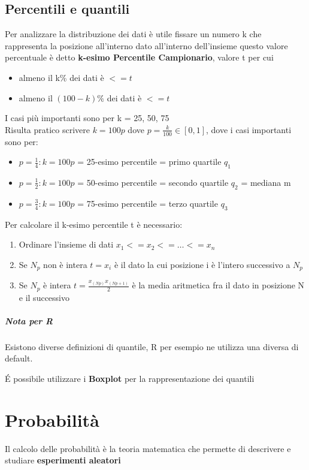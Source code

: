 \documentclass[12pt, a4paper, openany]{book}
\begin{document}
\section{Percentili e quantili}
Per analizzare la distribuzione dei dati è utile fissare un numero k che rappresenta la posizione all'interno dato all'interno dell'insieme
questo valore percentuale è detto \textbf{k-esimo Percentile Campionario}, valore t per cui
\begin{itemize}
    \item almeno il k\% dei dati è $ <= t$
    \item almeno il $(100 -k)\%$ dei dati è $<= t$
\end{itemize}

I casi più importanti sono per k = 25, 50, 75
\\ Risulta pratico scrivere $k = 100p$ dove $p = \frac{k}{100}\in [0, 1]$, dove i casi importanti sono per:
\begin{itemize} 
    \item $p = \frac{1}{4}: k = 100p$ = 25-esimo percentile = primo quartile $q_1$
    \item $p = \frac{1}{2}: k = 100p$ = 50-esimo percentile = secondo quartile $q_2$ = mediana m
    \item $p = \frac{3}{4}: k = 100p$ = 75-esimo percentile = terzo quartile $q_3$
\end{itemize}

Per calcolare il k-esimo percentile t è necessario:
\begin{enumerate}
    \item Ordinare l'insieme di dati $x_1 <= x_2 <= \dots <= x_n$
    \item Se $N_p$ non è intera $t=x_i$ è il dato la cui posizione i è l'intero successivo a $N_p$
    \item Se $N_p$ è intera $t = \frac{x_(Np) x_(Np+1)}{2}$ è la media aritmetica fra il dato in posizione N e il successivo 
\end{enumerate}

\paragraph{Nota per R} Esistono diverse definizioni di quantile, R per esempio ne utilizza una diversa di default.

\'E possibile utilizzare i \textbf{Boxplot} per la rappresentazione dei quantili

\chapter{Probabilità}
Il calcolo delle probabilità è la teoria matematica che permette di descrivere e studiare \textbf{esperimenti aleatori}
\end{document}
